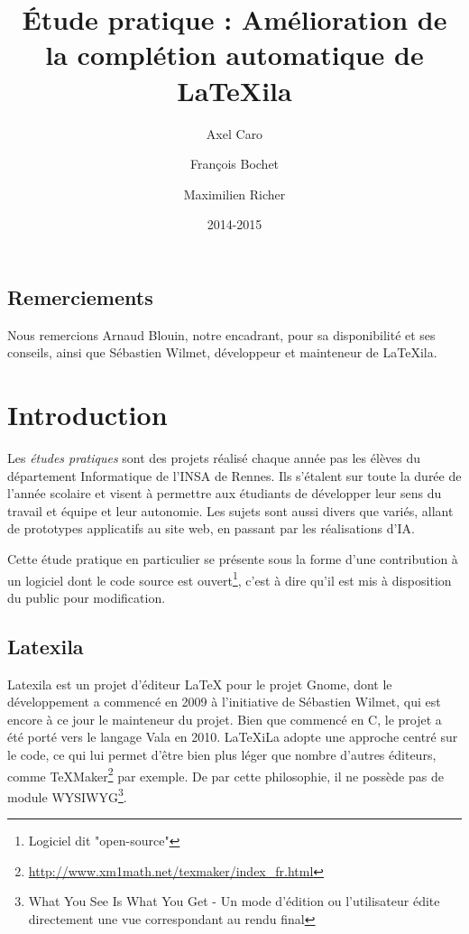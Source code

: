 \documentclass[a4paper,11pt]{report}
\title{Étude pratique : Amélioration de la complétion automatique de \LaTeX{}ila}
\author{Axel Caro\and François Bochet\and Maximilien Richer}
\date{2014-2015}
\begin{document}
\maketitle %
\tableofcontents %

\section{Remerciements} %
\label{sec:remerciements}
Nous remercions Arnaud Blouin, notre encadrant, pour sa disponibilité et ses conseils, ainsi que Sébastien Wilmet, développeur et mainteneur de LaTeXila.

\chapter{Introduction}
\label{cha:Introduction}
Les \textit{études pratiques} sont des projets réalisé chaque année pas les élèves du département Informatique de l'INSA de Rennes. Ils s'étalent sur toute la durée de l'année scolaire et visent à permettre aux étudiants de développer leur sens du travail et équipe et leur autonomie. Les sujets sont aussi divers que variés, allant de prototypes applicatifs au site web, en passant par les réalisations d'IA.

Cette étude pratique en particulier se présente sous la forme d'une contribution à un logiciel dont le code source est ouvert\footnote{Logiciel dit "open-source"}, c'est à dire qu'il est mis à disposition du public pour modification.

\section{Latexila}
\label{sec:latexila}
Latexila est un projet d'éditeur LaTeX pour le projet Gnome, dont le développement a commencé en 2009 à l'initiative de Sébastien Wilmet, qui est encore à ce jour le mainteneur du projet. Bien que commencé en C, le projet a été porté vers le langage Vala en 2010. LaTeXiLa adopte une approche centré sur le code, ce qui lui permet d'être bien plus léger que nombre d'autres éditeurs, comme TeXMaker\footnote{\url{http://www.xm1math.net/texmaker/index_fr.html}} par exemple. De par cette philosophie, il ne possède pas de module WYSIWYG\footnote{What You See Is What You Get - Un mode d'édition ou l'utilisateur édite directement une vue correspondant au rendu final}.

%

\end{document}
